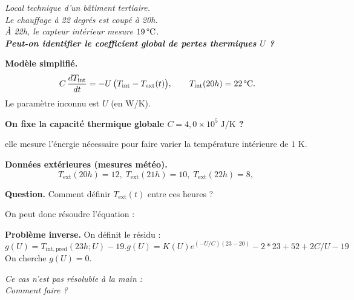 \begin{center}
\begin{mdframed}[backgroundcolor=ThemeLight, linecolor=Theme,
  linewidth=1.5pt, innertopmargin=10pt, innerbottommargin=10pt]
\centering\large\itshape
Local technique d'un bâtiment tertiaire.\\
Le chauffage à 22 degrés est coupé à 20h.\\
À 22h, le capteur intérieur mesure $19\,\text{\textdegree C}$.\\
\textbf{Peut-on identifier le coefficient global de pertes thermiques $U$ ?}
\end{mdframed}
\end{center}

\medskip

\textbf{Modèle simplifié.}
\[
  C\,\frac{dT_{\mathrm{int}}}{dt}
  = -U\,\bigl(T_{\mathrm{int}} - T_{\mathrm{ext}}(t)\bigr),
  \qquad T_{\mathrm{int}}(20h)=22\,\text{\textdegree C}.
\]
Le paramètre inconnu est $U$ (en W/K).

\medskip

\textbf{On fixe la capacité thermique globale $C=4{,}0\times10^5\;\mathrm{J/K}$ ?}

elle mesure l'énergie nécessaire pour faire varier
la température intérieure de $1$ K.



\medskip

\textbf{Données extérieures (mesures météo).}
\[
  T_{\mathrm{ext}}(20h)=12,\;
  T_{\mathrm{ext}}(21h)=10,\;
  T_{\mathrm{ext}}(22h)=8,\;
\]

\textbf{Question.}
Comment définir $T_{\mathrm{ext}}(t)$ entre ces heures ?


On peut donc résoudre l'équation : 
\medskip

\textbf{Problème inverse.}
On définit le résidu :
\[
  g(U) = T_{\mathrm{int,pred}}(23h;U)-19.
  g(U) = K(U) e^{(-U/C)(23 - 20)} -2*23 + 52+2C/U - 19
\]
On cherche $g(U)=0$.

\medskip

\begin{center}
\begin{mdframed}[backgroundcolor=ThemeLight, linecolor=Theme,
  linewidth=1pt, innertopmargin=8pt, innerbottommargin=8pt]
\centering\itshape
Ce cas n'est pas résoluble à la main :\\
Comment faire  ?
\end{mdframed}
\end{center}
